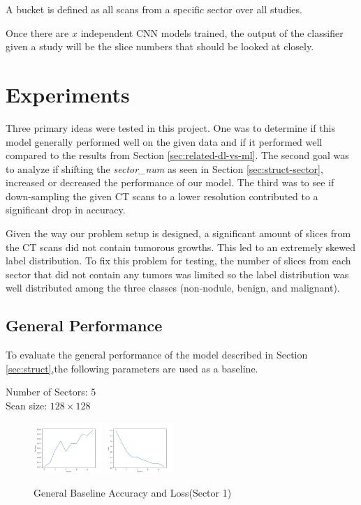 \documentclass[10pt,twocolumn,letterpaper]{article}
\begin{document}
        A bucket is defined as all scans from a specific sector over all studies.

        Once there are $x$ independent CNN models trained, the output of the classifier given a study will
        be the slice numbers that should be looked at closely.

\section{Experiments} \label{sec:experiments}
   Three primary ideas were tested in this project. One was to determine if this model generally performed well on the given data and if it performed well
   compared to the results from Section \ref{sec:related-dl-vs-ml}. The second goal was to analyze if shifting the
   {\it sector\_num} as seen in Section \ref{sec:struct-sector}, increased or decreased the performance of our model. The third was to see if down-sampling the
   given CT scans to a lower resolution contributed to a significant drop in accuracy.

   Given the way our problem setup is designed, a significant amount of slices from the CT scans did not contain tumorous growths. This led to an extremely
   skewed label distribution. To fix this problem for testing, the number of slices from each sector that did not contain any tumors was limited so the label
   distribution was well distributed among the three classes (non-nodule, benign, and malignant).

   \subsection{General Performance} \label{sec:experiments-general-performance}
      To evaluate the general performance of the model described in Section \ref{sec:struct},the following parameters are used as a baseline.

      \begin{center}
         Number of Sectors: $5$ \\
         Scan size: $128 \times 128$
      \end{center}

      \begin{figure}[h]
         \centering
         \includegraphics[width=0.23\textwidth]{./images/training_accuracy_5_sector_128_px.png}
         \includegraphics[width=0.23\textwidth]{./images/training_loss_5_sector_128_px.png}
         \caption{General Baseline Accuracy and Loss(Sector 1)}
         \label{fig:experiments-general-acc-loss}
      \end{figure}
\end{document}

